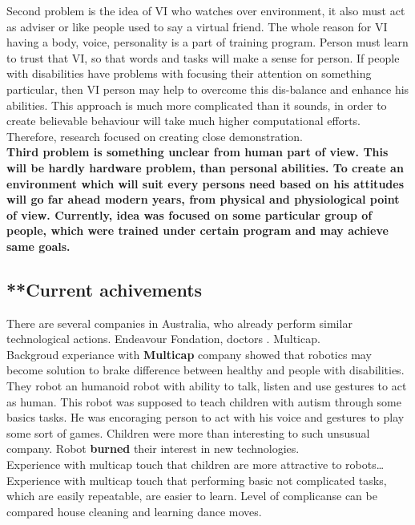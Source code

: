\documentclass[18pt]{article}
\numberwithin{equation}{section} %
\numberwithin{figure}{section} %
\numberwithin{table}{section} %
\begin{document}
	Second problem is the idea of VI who watches over environment, it also must act as adviser or like people used to say a virtual friend. The whole reason for VI having a body, voice, personality is a part of training program. Person must learn to trust that VI, so that words and tasks will make a sense for person. If people with disabilities have problems with focusing their attention on something particular, then VI person may help to overcome this dis-balance and enhance his abilities. This approach is much more complicated than it sounds, in order to create believable behaviour will take much higher computational efforts. Therefore, research focused on creating close demonstration.\\
	
	\textbf{Third problem is something unclear from human part of view. This will be hardly hardware problem, than personal abilities. To create an environment which will suit every persons need based on his attitudes will go far ahead modern years, from physical and physiological point of view. Currently, idea was focused on some particular group of people, which were trained under certain program and may achieve same goals.} \\
	
	\subsection{**Current achivements}		
	There are several companies in Australia, who already perform similar technological actions. Endeavour Fondation, doctors . Multicap. \\
	
	Backgroud experiance with \textbf{Multicap} company showed that robotics may become solution to brake difference between healthy and people with disabilities. They robot an humanoid robot with ability to talk, listen and use gestures to act as human. This robot was supposed to teach children with autism through some basics tasks. He was encoraging person to act with his voice and gestures to play some sort of games. Children were more than interesting to such unsusual company. Robot \textbf{burned} their interest in new technologies. \\
	
	Experience with multicap touch that children are more attractive to robots\ldots
	Experience with multicap touch that performing basic not complicated tasks, which are easily repeatable, are easier to learn. Level of complicanse can be compared house cleaning and learning dance moves.\\ 
	
\end{document}
